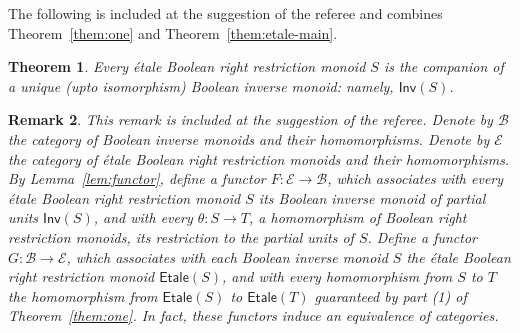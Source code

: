 \documentclass[a4paper]{amsart}
\newtheorem{theorem}{Theorem}[section]
\newtheorem{remark}[theorem]{Remark}
\begin{document}
The following is included at the suggestion of the referee and combines
Theorem~\ref{them:one} and Theorem~\ref{them:etale-main}.


\begin{theorem}\label{thm:referee} Every \'etale Boolean right restriction monoid $S$
is the companion of a unique (upto isomorphism) Boolean inverse monoid:
namely, $\mathsf{Inv}(S)$.
\end{theorem}

\begin{remark}\label{rem:functor}
{\em This remark is included at the suggestion of the referee.
Denote by $\mathscr{B}$ the category of Boolean inverse monoids and their homomorphisms.
Denote by $\mathscr{E}$ the category of \'etale Boolean right restriction monoids and their homomorphisms.
By Lemma~\ref{lem:functor}, define a functor $F \colon \mathscr{E} \rightarrow \mathscr{B}$,
which associates with every \'etale Boolean right restriction monoid $S$
its Boolean inverse monoid of partial units $\mathsf{Inv}(S)$,
and with every $\theta \colon S \rightarrow T$, a homomorphism of Boolean 
right restriction monoids, its restriction to the partial units of $S$.
Define a functor $G \colon \mathscr{B} \rightarrow \mathscr{E}$, 
which associates with each Boolean inverse monoid $S$ the
\'etale Boolean right restriction monoid $\mathsf{Etale}(S)$,
and with every homomorphism from $S$ to $T$
the homomorphism from $\mathsf{Etale}(S)$ to $\mathsf{Etale}(T)$
guaranteed by part (1) of Theorem~\ref{them:one}.
In fact, these functors induce an equivalence of categories.
}
\end{remark}
\end{document}
